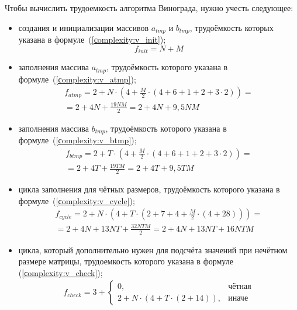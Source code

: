 Чтобы вычислить трудоемкость алгоритма Винограда, нужно учесть следующее:
\begin{itemize}[label=---]
	\item создания и инициализации массивов $a_{tmp}$ и $b_{tmp}$, трудоёмкость которых указана в формуле~(\ref{сomplexity:v_init});
	\begin{equation}
		\label{сomplexity:v_init}
		f_{init} = N + M
	\end{equation}
	\item заполнения массива $a_{tmp}$, трудоёмкость которого указана в формуле~(\ref{сomplexity:v_atmp});
	\begin{equation}
		\label{сomplexity:v_atmp}
		\begin{gathered}
			f_{atmp} = 2 + N \cdot (4 + \frac{M}{2} \cdot (4 + 6 + 1 + 2 + 3 \cdot 2)) = \\
			= 2 + 4N + \frac{19NM}{2} = 2 + 4N + 9,5NM
		\end{gathered} 
	\end{equation}
	\item заполнения массива $b_{tmp}$, трудоёмкость которого указана в формуле~(\ref{сomplexity:v_btmp});
	\begin{equation}
		\label{сomplexity:v_btmp}
		\begin{gathered}
			f_{btmp} = 2 + T \cdot (4 + \frac{M}{2} \cdot (4 + 6 + 1 + 2 + 3 \cdot 2)) = \\
			= 2 + 4T + \frac{19TM}{2} = 2 + 4T + 9,5TM
		\end{gathered}  
	\end{equation}
	\clearpage
	\item цикла заполнения для чётных размеров, трудоёмкость которого указана в формуле~(\ref{сomplexity:v_cycle});
	\begin{equation}
		\label{сomplexity:v_cycle}
		\begin{gathered}
			f_{cycle} = 2 + N \cdot (4 + T \cdot (2 + 7 + 4 + \frac{M}{2} \cdot (4 + 28))) = \\
			= 2 + 4N + 13NT + \frac{32NTM}{2}  = 2 + 4N + 13NT + 16NTM 
		\end{gathered}
	\end{equation}
	\item цикла, который дополнительно нужен для подсчёта значений при нечётном размере матрицы, трудоемкость которого указана в формуле (\ref{сomplexity:v_check});
	\begin{equation}
		\label{сomplexity:v_check}
		\begin{gathered}
			f_{check} = 3 + 
			\begin{cases}
				0, & \text{чётная} \\
				2 + N \cdot (4 + T \cdot (2 + 14)), & \text{иначе}
			\end{cases}
		\end{gathered}  
	\end{equation}
\end{itemize}

